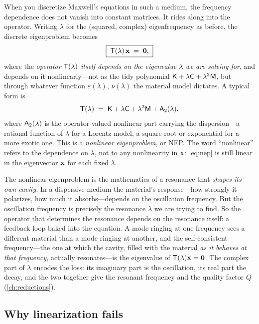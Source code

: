 When you discretize Maxwell's equations in such a medium, the frequency
dependence does not vanish into constant matrices. It rides along into the
operator. Writing $\lambda$ for the (squared, complex) eigenfrequency as before,
the discrete eigenproblem becomes
\begin{equation}
  \boxed{\;\mathsf{T}(\lambda)\,\mathbf{x} \;=\; \mathbf 0,\;}
  \label{eq:nep}
\end{equation}
where the \emph{operator} $\mathsf{T}(\lambda)$ \emph{itself depends on the
eigenvalue $\lambda$ we are solving for}, and depends on it nonlinearly---not as
the tidy polynomial $\mathsf{K}+\lambda\mathsf{C}+\lambda^2\mathsf{M}$, but through whatever
function $\varepsilon(\lambda)$, $\nu(\lambda)$ the material model dictates. A
typical form is
\begin{equation}
  \mathsf{T}(\lambda) \;=\; \mathsf{K} + \lambda\mathsf{C} + \lambda^2\mathsf{M} + \mathsf{A}_2(\lambda),
  \label{eq:nep-form}
\end{equation}
where $\mathsf{A}_2(\lambda)$ is the operator-valued nonlinear part carrying the
dispersion---a rational function of $\lambda$ for a Lorentz model, a square-root
or exponential for a more exotic one. This is a \emph{nonlinear eigenproblem}, or
NEP. The word ``nonlinear'' refers to the dependence on $\lambda$, not to any
nonlinearity in $\mathbf{x}$: \cref{eq:nep} is still linear in the eigenvector $\mathbf{x}$ for
each fixed $\lambda$.

\begin{physicsbox}
The nonlinear eigenproblem is the mathematics of a resonance that \emph{shapes its
own cavity}. In a dispersive medium the material's response---how strongly it
polarizes, how much it absorbs---depends on the oscillation frequency. But the
oscillation frequency is precisely the resonance $\lambda$ we are trying to find.
So the operator that determines the resonance depends on the resonance itself: a
feedback loop baked into the equation. A mode ringing at one frequency sees a
different material than a mode ringing at another, and the self-consistent
frequency---the one at which the cavity, filled with the material \emph{as it
behaves at that frequency}, actually resonates---is the eigenvalue of
$\mathsf{T}(\lambda)\mathbf{x}=\mathbf 0$. The complex part of $\lambda$ encodes the loss:
its imaginary part is the oscillation, its real part the decay, and the two
together give the resonant frequency and the quality factor $Q$
(\cref{ch:reductions}).
\end{physicsbox}

\subsection{Why linearization fails}
\label{sec:def-linfails}

